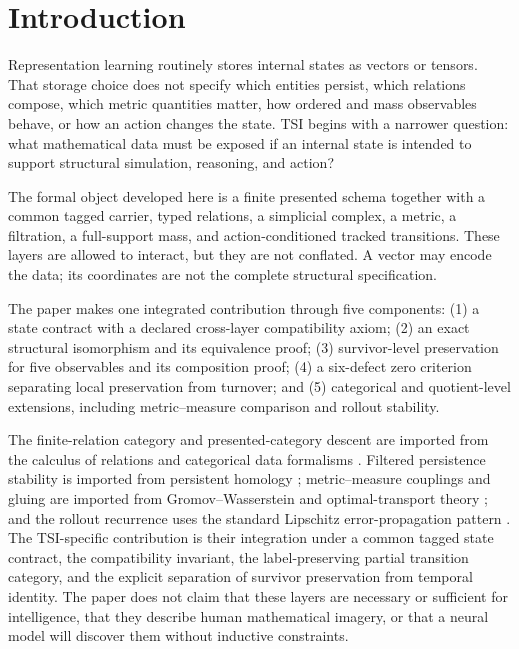 \section{Introduction}

Representation learning routinely stores internal states as vectors or tensors.
That storage choice does not specify which entities persist, which relations
compose, which metric quantities matter, how ordered and mass observables behave,
or how an action changes the state. TSI begins with a narrower question: what
mathematical data must be exposed if an internal state is intended to support
structural simulation, reasoning, and action?

The formal object developed here is a finite presented schema together with a
common tagged carrier, typed relations, a simplicial complex, a metric, a
filtration, a full-support mass, and action-conditioned tracked transitions.
These layers are allowed to interact, but they are not conflated. A vector may
encode the data; its coordinates are not the complete structural specification.

The paper makes one integrated contribution through five components:
(1) a state contract with a declared cross-layer compatibility axiom;
(2) an exact structural isomorphism and its equivalence proof;
(3) survivor-level preservation for five observables and its composition proof;
(4) a six-defect zero criterion separating local preservation from turnover; and
(5) categorical and quotient-level extensions, including metric--measure
comparison and rollout stability.

The finite-relation category and presented-category descent are imported from
the calculus of relations and categorical data formalisms
\cite{freydscedrov1990categories,spivak2012functorial,
spivakwisnesky2015relational}. Filtered persistence stability is imported from
persistent homology \cite{cohensteiner2007stability,chazal2009proximity};
metric--measure couplings and gluing are imported from Gromov--Wasserstein and
optimal-transport theory \cite{memoli2011gromov,peyre2019computational}; and the
rollout recurrence uses the standard Lipschitz error-propagation pattern
\cite{asadi2018lipschitz}. The TSI-specific contribution is their integration
under a common tagged state contract, the compatibility invariant, the
label-preserving partial transition category, and the explicit separation of
survivor preservation from temporal identity. The paper does not claim that
these layers are necessary or sufficient for intelligence, that they describe
human mathematical imagery, or that a neural model will discover them without
inductive constraints.
